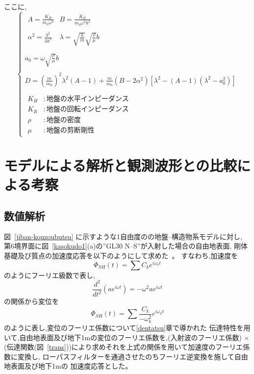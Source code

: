 \documentclass[titlepage]{jsarticle}
\def\dfrac#1#2{{\displaystyle\frac{#1}{#2}}}
\begin{document}
ここに,
\begin{equation} \left\{ \begin{array}{l}\begin{array}{ll}
A = \dfrac{K_H}{m_0 \omega ^2} & B = \dfrac{K_R}{m_0\omega ^2 h^2} \\ \\
\alpha ^2 = \dfrac{b^2}{3h^2}   & \lambda = \sqrt{\dfrac{k}{m}}\sqrt{\dfrac{\rho }{\mu }} b
\end{array} \\ \\
a_0 = \omega\sqrt{\dfrac{\rho }{\mu }} b \\ \\
D = \left( \dfrac{m}{m_0}\right) ^2\lambda ^2\left( A-1\right) +
\dfrac{m}{m_0}\left( B-2\alpha ^2 \right) \left[ \lambda ^2 -\left( A-1\right)
\left( \lambda ^2 -a_0^2 \right) \right] \\ \\
\begin{array}{ll}
K_H & :地盤の水平インピーダンス \\
K_R & :地盤の回転インピーダンス \\
\rho & :地盤の密度 \\
\mu & :地盤の剪断剛性 \end{array}\end{array}
\right. \label{kigou5}
\end{equation}

\section{モデルによる解析と観測波形との比較による考察}\label{kaiseki}
\subsection{数値解析}
図~\ref{jiban-kouzoubutsu} に示すような1自由度のの地盤--構造物系モデルに対し,
第6境界面に図~\ref{kasokudo1}(a)の''GL30 N--S''が入射した場合の自由地表面,
剛体基礎及び質点の加速度応答を以下のようにして求めた~\cite{osaki,shibata}。
すなわち,加速度を
\begin{equation}
\ddot{\Phi }_{SH}(t) = \sum C_k e^{i\omega _k t} \label{fourier..}
\end{equation}
のようにフーリエ級数で表し,
\begin{equation}
\dfrac{d^2}{dt^2} \left( ae^{i\omega t} \right) = -\omega ^2 ae^{i\omega t}
\end{equation}
の関係から変位を
\begin{equation}
\Phi _{SH}(t) = \sum \dfrac{C_k}{-\omega _k^2} e^{i\omega _k t} \label{fourier}
\end{equation}
のように表し,変位のフーリエ係数について\ref{dentatsu}章で導かれた
伝達特性を用いて,自由地表面及び地下1mの変位のフーリエ係数を,(入射波のフーリエ係数)
$\times $(伝達関数(図~\ref{trans}))により求めそれを上式の関係を用いて加速度のフーリエ係数に変換し,
ローパスフィルターを通過させたのちフーリエ逆変換を施して自由地表面及び地下1mの
加速度応答とした。
\end{document}
